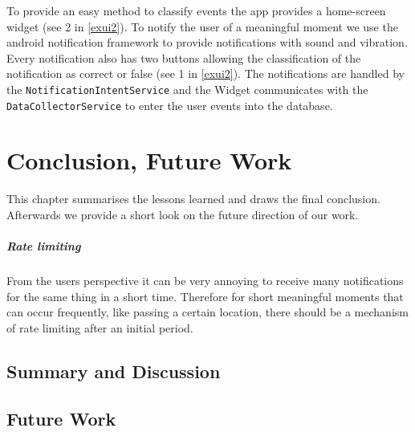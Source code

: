 \documentclass[a4paper]{report}
\begin{document}
To provide an easy method to classify events the app provides a home-screen widget (see 2 in \autoref{exui2}). To notify the user of a meaningful moment we use the android notification framework to provide notifications with sound and vibration. Every notification also has two buttons allowing the classification of the notification as correct or false (see 1 in \autoref{exui2}).
The notifications are handled by the \texttt{NotificationIntentService} and the Widget communicates with the \texttt{DataCollectorService} to enter the user events into the database.\\ 


\chapter{Conclusion, Future Work}\label{chap:conclusion}
This chapter summarises the lessons learned and draws the final conclusion. Afterwards we provide a short look on the future direction of our work.
\paragraph{Rate limiting} From the users perspective it can be very annoying to receive many notifications for the same thing in a short time. Therefore for short meaningful moments that can occur frequently, like passing a certain location, there should be a mechanism of rate limiting after an initial period.
\section{Summary and Discussion}

\section{Future Work}

\end{document}
